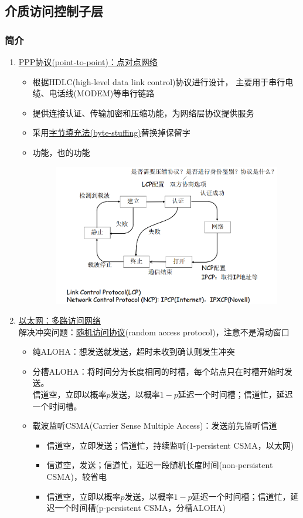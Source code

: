 \subsection{介质访问控制子层}
\subsubsection{简介}
\begin{enumerate}
\item \underline{PPP协议(point-to-point)：点对点网络}
\begin{itemize}
	\item 根据HDLC(high-level data link control)协议进行设计，
	主要用于串行电缆、电话线(MODEM)等串行链路
	\item 提供连接认证、传输加密和压缩功能，为网络层协议提供服务
	\item 采用\underline{字节填充法(byte-stuffing)}替换掉保留字
	\item {}功能，也的功能
	\begin{figure}[H]
		\centering
		\includegraphics[width=0.6\linewidth]{fig/PPP.PNG}
	\end{figure}
\end{itemize}

\item \underline{以太网：多路访问网络}\\
解决冲突问题：\underline{随机访问协议}(random access protocol)，注意不是滑动窗口
\begin{itemize}
\item 纯ALOHA：想发送就发送，超时未收到确认则发生冲突
\item 分槽ALOHA：将时间分为长度相同的时槽，每个站点只在时槽开始时发送。\\
信道空，立即以概率$p$发送，以概率$1-p$延迟一个时间槽；信道忙，延迟一个时间槽。
\item 载波监听CSMA(Carrier Sense Multiple Access)：发送前先监听信道
\begin{itemize}
	\item 信道空，立即发送；信道忙，持续监听(1-persistent CSMA，以太网)
	\item 信道空，发送；信道忙，延迟一段随机长度时间(non-persistent CSMA)，较省电
	\item 信道空，立即以概率$p$发送，以概率$1-p$延迟一个时间槽；信道忙，延迟一个时间槽(p-persistent CSMA，分槽ALOHA)
\end{itemize}
\end{itemize}
\end{enumerate}

